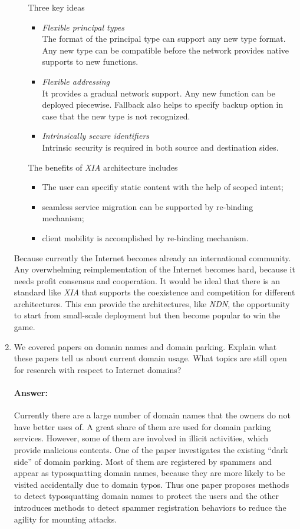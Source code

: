 \documentclass[a4paper,11pt]{article}
\theoremstyle{mytheor}
\begin{document}
\begin{enumerate}
\begin{itemize}
Three key ideas 
\begin{itemize}
\item \emph{Flexible principal types} \\
The format of the principal type can support any new type format.
Any new type can be compatible before the network provides native supports to new functions.
\item \emph{Flexible addressing} \\
It provides a gradual network support.
Any new function can be deployed piecewise.
Fallback also helps to specify backup option in case that the new type is not recognized.
\item \emph{Intrinsically secure identifiers} \\
Intrinsic security is required in both source and destination sides.  
\end{itemize}
The benefits of \emph{XIA} architecture includes
\begin{itemize}
	\item The user can specifiy static content with the help of scoped intent;
	\item seamless service migration can be supported by re-binding mechanism;
	\item client mobility is accomplished by re-binding mechanism.
\end{itemize}
\end{itemize}

Because currently the Internet becomes already an international community.
Any overwhelming reimplementation of the Internet becomes hard, because it needs profit consensus and cooperation.
It would be ideal that there is an standard like \emph{XIA} that supports the coexistence and competition for different architectures.
This can provide the architectures, like \emph{NDN}, the opportunity to start from small-scale deployment but then become popular to win the game.

\item 
We covered papers on domain names and domain parking. 
Explain what these papers tell us about current domain usage. 
What topics are still open for research with respect to Internet domains?
\paragraph{Answer:}
Currently there are a large number of domain names that the owners do not have better uses of.
A great share of them are used for domain parking services.
However, some of them are involved in illicit activities, which provide malicious contents.
One of the paper investigates the existing ``dark side'' of domain parking.
Most of them are registered by spammers and appear as typosquatting domain names, because they are more likely to be visited accidentally due to domain typos.
Thus one paper proposes methods to detect typosquatting domain names to protect the users and the other introduces methods to detect spammer registration behaviors to reduce the agility for mounting attacks.


\end{enumerate}
\end{document}
